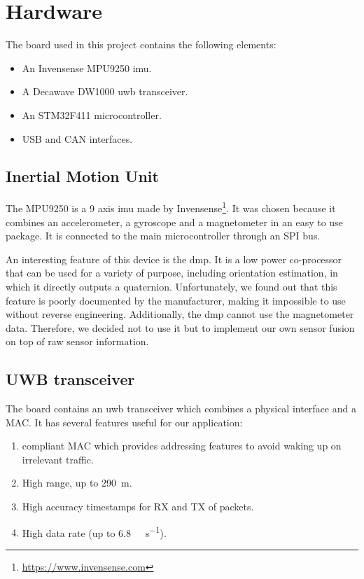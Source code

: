 \documentclass[a4paper, 12pt]{scrreprt}
\begin{document}

\chapter{Hardware}

The board used in this project contains the following elements:

\begin{itemize}
    \item An Invensense MPU9250 \gls{imu}.
    \item A Decawave DW1000 \gls{uwb} transceiver.
    \item An STM32F411 microcontroller.
    \item USB and CAN interfaces.
\end{itemize}

\section{Inertial Motion Unit}

The MPU9250 is a 9 axis \gls{imu} made by Invensense\footnote{\url{https://www.invensense.com}}.
It was chosen because it combines an accelerometer, a gyroscope and a magnetometer in an easy to use package.
It is connected to the main microcontroller through an SPI bus.

An interesting feature of this device is the \gls{dmp}.
It is a low power co-processor that can be used for a variety of purpose, including orientation estimation, in which it directly outputs a quaternion.
Unfortunately, we found out that this feature is poorly documented by the manufacturer, making it impossible to use without reverse engineering.
Additionally, the \gls{dmp} cannot use the magnetometer data.
Therefore, we decided not to use it but to implement our own sensor fusion on top of raw sensor information.

\section{UWB transceiver}
The board contains an \gls{uwb} transceiver which combines a physical interface and a MAC.
It has several features useful for our application:
\begin{enumerate}
    \item \ieeepan{} compliant MAC which provides addressing features to avoid waking up on irrelevant traffic.
    \item High range, up to \SI{290}{\meter}.
    \item High accuracy timestamps for RX and TX of packets.
    \item High data rate (up to \SI{6.8}{\mega\bit\per\second}).
    \end{enumerate}
\end{document}
